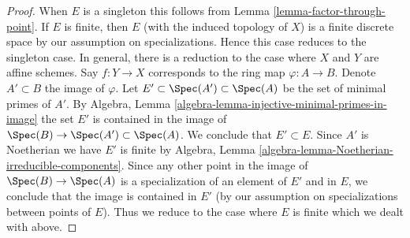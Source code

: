 \begin{proof}
When $E$ is a singleton this follows from
Lemma \ref{lemma-factor-through-point}. If $E$ is finite, then $E$
(with the induced topology of $X$) is a finite discrete space by
our assumption on specializations. Hence this case reduces to the
singleton case. In general, there is a reduction to the
case where $X$ and $Y$ are affine schemes. Say $f : Y \to X$ corresponds to
the ring map $\varphi : A \to B$. Denote $A' \subset B$ the image of $\varphi$.
Let $E' \subset \Spec(A') \subset \Spec(A)$ be the set of minimal primes
of $A'$. By Algebra, Lemma \ref{algebra-lemma-injective-minimal-primes-in-image}
the set $E'$ is contained in the image of
$\Spec(B) \to \Spec(A') \subset \Spec(A)$. We conclude that $E' \subset E$.
Since $A'$ is Noetherian we have $E'$ is finite by Algebra, Lemma
\ref{algebra-lemma-Noetherian-irreducible-components}.
Since any other point in the image of $\Spec(B) \to \Spec(A)$ is
a specialization of an element of $E'$ and in $E$, we conclude that
the image is contained in $E'$ (by our assumption on specializations between
points of $E$). Thus we reduce to the case where
$E$ is finite which we dealt with above.
\end{proof}










